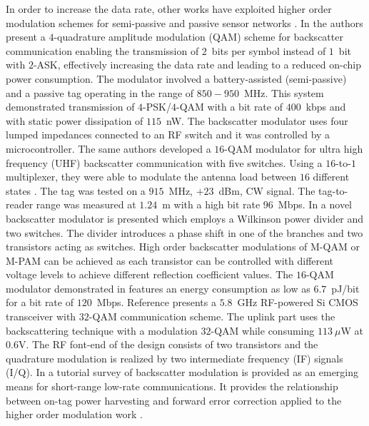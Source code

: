 \documentclass[journal]{IEEEtran}
\begin{document}
In order to increase the data rate, other works have exploited higher order modulation schemes for semi-passive and passive sensor networks \cite{thomas2010qam,thomas2012quadrature, kimionis2017millimeter}. 
%
In \cite{thomas2012quadrature} the authors present a $4$-quadrature amplitude modulation (QAM) scheme for backscatter communication enabling the transmission of $2$~bits per symbol instead of $1$~bit  with $2$-ASK, effectively increasing the data rate and leading to a reduced on-chip power consumption.
%
The modulator involved a battery-assisted (semi-passive)  and a passive tag operating in the range of  $850-950$~MHz.
%
This system demonstrated transmission of $4$-PSK/$4$-QAM   with  a bit rate  of $400$~kbps and with  static power dissipation of $115$~nW.
%
The backscatter modulator uses four lumped impedances  connected to an RF switch and it  was controlled by a microcontroller. 
% 
The same authors developed a $16$-QAM modulator for ultra high frequency (UHF) backscatter communication with five switches. 
%
Using a $16$-to-$1$ multiplexer, they were able to modulate the antenna load  between $16$ different states \cite{thomas201296}.
%
The tag was tested on  a $915$~MHz, $+23$~dBm,  CW signal.
% 
The tag-to-reader range was measured at $1.24$~m with a high bit rate $96$~Mbps. 
%
In \cite{correia2017quadrature} a novel backscatter modulator is presented which employs a Wilkinson power divider and two switches. 
%
The  divider introduces a phase shift  in one of the branches and two transistors acting as switches.
%
High order backscatter modulations  of M-QAM or M-PAM  can be achieved as each transistor can be controlled with different voltage levels to achieve different reflection coefficient values.   
%
The  $16$-QAM modulator demonstrated in \cite{correia2017quadrature}
features an   energy consumption as low as $6.7$~pJ/bit for a bit rate of $120$~Mbps.
%
 Reference \cite{shirane201513} presents a $5.8$~GHz RF-powered Si CMOS transceiver   with $32$-QAM communication scheme.
%
The uplink part uses the  backscattering technique   with a modulation $32$-QAM while consuming $113~\mu$W at $0.6$V. 
%
The RF font-end of the design consists of two transistors and the quadrature modulation is realized by two  intermediate frequency (IF) signals (I/Q).
%
In \cite{boyer2014invited}  a tutorial survey of backscatter modulation is  provided as an emerging means for short-range low-rate communications.
%
It provides the  relationship between on-tag
power harvesting and forward error correction applied to the higher order modulation  work \cite{thomas2010qam}.
%
\end{document}
